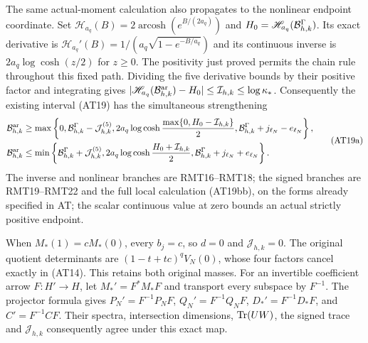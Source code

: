 The same actual-moment calculation also propagates to the nonlinear
endpoint coordinate. Set
$\mathscr H_{a_q}(B)=2\operatorname{arcosh}(e^{B/(2a_q)})$ and
$H_0=\mathscr H_{a_q}(\mathcal B^\Gamma_{h,k})$.
Its exact derivative is
$\mathscr H_{a_q}'(B)=1/(a_q\sqrt{1-e^{-B/a_q}})$ and its continuous
inverse is $2a_q\log\cosh(z/2)$ for $z\ge0$.
The positivity just proved permits the chain rule throughout this
fixed path. Dividing the five derivative bounds by their positive
factor and integrating gives
$|\mathscr H_{a_q}(\mathcal B^{\mathrm{ar}}_{h,k})-H_0|
\le\mathcal I_{h,k}\le\log\kappa_*$.
Consequently the existing interval (AT19) has the simultaneous
strengthening
\[
 \begin{aligned}
 \mathcal B^{\mathrm{ar}}_{h,k}&\ge
 \max\left\{0,\mathcal B^\Gamma_{h,k}-\mathcal J_{h,k}^{(5)},
 2a_q\log\cosh\frac{\max\{0,H_0-\mathcal I_{h,k}\}}2,
 \mathcal B^\Gamma_{h,k}+j_{\ell_N}-e_{\ell_N}\right\},\\
 \mathcal B^{\mathrm{ar}}_{h,k}&\le
 \min\left\{\mathcal B^\Gamma_{h,k}+\mathcal J_{h,k}^{(5)},
 2a_q\log\cosh\frac{H_0+\mathcal I_{h,k}}2,
 \mathcal B^\Gamma_{h,k}+j_{\ell_N}+e_{\ell_N}\right\}.
 \end{aligned}
 \tag{AT19a}
\]
The inverse and nonlinear branches are RMT16--RMT18; the signed
branches are RMT19--RMT22 and the full local calculation (AT19bb),
on the forms already specified in AT; the scalar continuous value
at zero bounds an actual strictly positive endpoint.

When $M_*(1)=cM_*(0)$, every $b_j=c$, so $d=0$ and
$\mathcal J_{h,k}=0$. The original quotient determinants are
$(1-t+tc)^qV_N(0)$, whose four factors cancel exactly in (AT14).
This retains both original masses. For an invertible coefficient
arrow $F:H'\to H$, let $M_*'=F^*M_*F$ and transport every subspace
by $F^{-1}$. The projector formula gives
$P_N'=F^{-1}P_NF$, $Q_N'=F^{-1}Q_NF$,
$D_*'=F^{-1}D_*F$, and $C'=F^{-1}CF$.
Their spectra, intersection dimensions, $\operatorname{Tr}(UW)$, the signed
trace and $\mathcal J_{h,k}$ consequently agree under this exact map.

